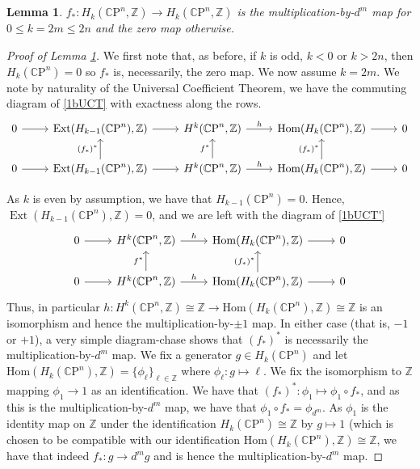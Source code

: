 \documentclass[english]{article}
\newcommand{\CC}{\mathbb{C}}
\newcommand{\ZZ}{\mathbb{Z}}
\newenvironment{subproof}[1][\proofname]{%
	\renewcommand{\qedsymbol}{$\blacksquare$}%
	\begin{proof}[#1]%
	}{%
	\end{proof}%
}
\newcommand{\prt}[1]{\setcounter{subsection}{#1-1}\subsection{}}
\newtheorem{lemma}[theorem]{Lemma}
\theoremstyle{remark}
\theoremstyle{definition}
\renewcommand{\hom}{\mathrm{Hom}}
\newcommand{\CP}{{\CC\mathrm{P}}}
\DeclareMathOperator{\ext}{Ext}
\begin{document}
\prt{2}
\begin{lemma}\label{1bcoin}
	$f_*:H_{k}(\CP^n,\ZZ)\to H_k(\CP^n,\ZZ)$ is the multiplication-by-$d^m$ map for $0\leq k=2m\leq 2n$ and the zero map otherwise.
\end{lemma}
\begin{subproof}[Proof of Lemma \ref{1bcoin}]
We first note that, as before, if $k$ is odd, $k<0$ or $k>2n$, then $H_k(\CP^n)=0$ so $f_*$ is, necessarily, the zero map. We now assume $k=2m$. We note by naturality of the Universal Coefficient Theorem, we have the commuting diagram of \eqref{1bUCT} with exactness along the rows.
\begin{equation}\label{1bUCT}
	\begin{tikzcd}
	0\arrow[r]&\ext(H_{k-1}(\CP^n),\ZZ)\arrow[r]&H^k(\CP^n,\ZZ)\arrow[r,"h"]&\hom(H_k(\CP^n),\ZZ)\arrow[r]&0\\
	0\arrow[r]&\ext(H_{k-1}(\CP^n),\ZZ)\arrow[r]\arrow[u,"(f_*)^*"]&H^k(\CP^n,\ZZ)\arrow[r,"h"]\arrow[u,"f^*"]&\hom(H_k(\CP^n),\ZZ)\arrow[r]\arrow[u,"(f_*)^*"]&0
	\end{tikzcd}
\end{equation}

As $k$ is even by assumption, we have that $H_{k-1}(\CP^n)=0$. Hence, $\ext(H_{k-1}(\CP^n),\ZZ)=0$, and we are left with the diagram of \eqref{1bUCT'}
\begin{equation}\label{1bUCT'}
\begin{tikzcd}
0\arrow[r]&H^k(\CP^n,\ZZ)\arrow[r,"h"]&\hom(H_k(\CP^n),\ZZ)\arrow[r]&0\\
0\arrow[r]&H^k(\CP^n,\ZZ)\arrow[r,"h"]\arrow[u,"f^*"]&\hom(H_k(\CP^n),\ZZ)\arrow[r]\arrow[u,"(f_*)^*"]&0
\end{tikzcd}
\end{equation}
Thus, in particular $h:H^k(\CP^n,\ZZ)\cong \ZZ\to \hom(H_k(\CP^n),\ZZ)\cong \ZZ$ is an isomorphism and hence the multiplication-by-$\pm1$ map. In either case (that is, $-1$ or $+1$), a very simple diagram-chase shows that $(f_*)^*$ is necessarily the multiplication-by-$d^m$ map. We fix a generator $g\in H_k(\CP^n)$ and let $\hom(H_k(\CP^n),\ZZ)=\{\phi_\ell\}_{\ell\in\ZZ}$ where $\phi_\ell:g\mapsto \ell $. We fix the isomorphism to $\ZZ$ mapping $\phi_1\to 1$ as an identification. We have that $(f_*)^*:\phi_1\mapsto \phi_1\circ f_*$, and as this is the multiplication-by-$d^m$ map, we have that $\phi_1\circ f_*=\phi_{d^m}$. As $\phi_1$ is the identity map on $\ZZ$ under the identification $H_k(\CP^n)\cong \ZZ$ by $g\mapsto 1$ (which is chosen to be compatible with our identification $ \hom(H_k(\CP^n),\ZZ)\cong \ZZ$, we have that indeed $f_*:g\to d^m g$ and is hence the multiplication-by-$d^m$ map.
\end{subproof}
\end{document}
